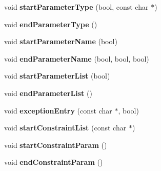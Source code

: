 \begin{DoxyCompactItemize}
\item 
\hypertarget{class_r_t_f_generator_a16e366b8ae01f3d7dea6bef22426a623}{void {\bfseries start\-Parameter\-Type} (bool, const char $\ast$)}\label{class_r_t_f_generator_a16e366b8ae01f3d7dea6bef22426a623}

\item 
\hypertarget{class_r_t_f_generator_a1e61ed71851d9423940748df3342715b}{void {\bfseries end\-Parameter\-Type} ()}\label{class_r_t_f_generator_a1e61ed71851d9423940748df3342715b}

\item 
\hypertarget{class_r_t_f_generator_aaa80b6d46b0b3f69f5604a6394aad2de}{void {\bfseries start\-Parameter\-Name} (bool)}\label{class_r_t_f_generator_aaa80b6d46b0b3f69f5604a6394aad2de}

\item 
\hypertarget{class_r_t_f_generator_a2eb32de99cf4ffa66d38b4d1dc304ad4}{void {\bfseries end\-Parameter\-Name} (bool, bool, bool)}\label{class_r_t_f_generator_a2eb32de99cf4ffa66d38b4d1dc304ad4}

\item 
\hypertarget{class_r_t_f_generator_a61b1ab9b798f5af0ec297a1b70b943eb}{void {\bfseries start\-Parameter\-List} (bool)}\label{class_r_t_f_generator_a61b1ab9b798f5af0ec297a1b70b943eb}

\item 
\hypertarget{class_r_t_f_generator_a18eb29acbeb3f72b0d8f4ea23b21f054}{void {\bfseries end\-Parameter\-List} ()}\label{class_r_t_f_generator_a18eb29acbeb3f72b0d8f4ea23b21f054}

\item 
\hypertarget{class_r_t_f_generator_afe0983cd10a7702e0bf3c3596b9f7b87}{void {\bfseries exception\-Entry} (const char $\ast$, bool)}\label{class_r_t_f_generator_afe0983cd10a7702e0bf3c3596b9f7b87}

\item 
\hypertarget{class_r_t_f_generator_afe53ac5dd11e37006dd610540fc634a2}{void {\bfseries start\-Constraint\-List} (const char $\ast$)}\label{class_r_t_f_generator_afe53ac5dd11e37006dd610540fc634a2}

\item 
\hypertarget{class_r_t_f_generator_afd7a8f4d6caba86120db8bff0fa37422}{void {\bfseries start\-Constraint\-Param} ()}\label{class_r_t_f_generator_afd7a8f4d6caba86120db8bff0fa37422}

\item 
\hypertarget{class_r_t_f_generator_a01ad4ae7d141c58991b7a9575a67b6cb}{void {\bfseries end\-Constraint\-Param} ()}\label{class_r_t_f_generator_a01ad4ae7d141c58991b7a9575a67b6cb}


\end{DoxyCompactItemize}
